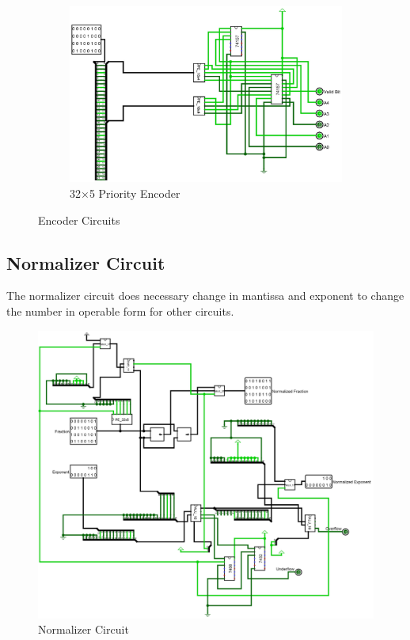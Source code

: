 \documentclass[12pt]{article}
\begin{document}
\begin{figure}[H]
\begin{subfigure}[b]{0.45\textwidth}
        \label{fig:16x4prioenc}
    \end{subfigure}
    \newline
    \newline
    \begin{subfigure}[b]{0.9\textwidth}
        \includegraphics[width=\textwidth]{PE_32x5.jpg}
        \caption{32$\times$5 Priority Encoder}
        \label{fig:32x5prioenc}
    \end{subfigure}
    \caption{Encoder Circuits}\label{fig:encoder}
\end{figure}
\newpage
\subsection{Normalizer Circuit}
The normalizer circuit does necessary change in mantissa and exponent to change the number in operable form for other circuits.
\begin{figure}[H]
    \centering
        \includegraphics[width=\textwidth]{Normalizer.jpg}
    \caption{ Normalizer Circuit }\label{fig:normalizer}
\end{figure}
\end{document}
